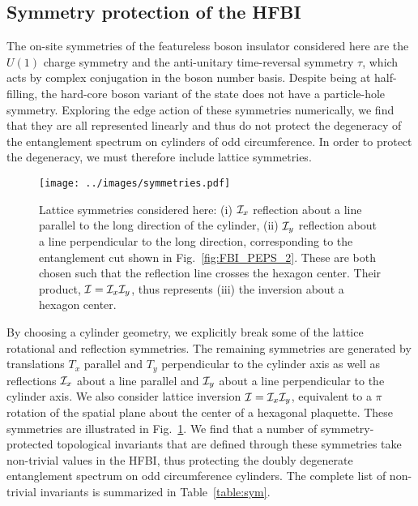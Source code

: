 \subsection{Symmetry protection of the HFBI}

The on-site symmetries of the featureless boson insulator considered here
are the $U(1)$ charge symmetry and the 
anti-unitary time-reversal symmetry $\tau$, which acts by complex conjugation in the boson number basis.
Despite being at half-filling, the hard-core boson variant of the state does not have a particle-hole
symmetry. Exploring the edge action of these symmetries numerically, we find that they are all
represented linearly and thus do not protect the degeneracy of the entanglement spectrum
on cylinders of odd circumference.
In order to protect the degeneracy, we must therefore include lattice symmetries.

\begin{figure}
  \texttt{[image: ../images/symmetries.pdf]}
  \caption{Lattice symmetries considered here:
  (i) $\mathcal{I}_x$ reflection about a line parallel to the long direction of the cylinder,
  (ii) $\mathcal{I}_y$ reflection about a line perpendicular to the long direction, corresponding to the entanglement
  cut shown in Fig.~\ref{fig:FBI_PEPS_2}. These are both chosen such that the reflection line
  crosses the hexagon center. Their product, $\mathcal{I} = \mathcal{I}_x \mathcal{I}_y$, thus represents (iii) the inversion about
  a hexagon center. \label{fig:symm} }
\end{figure}

By choosing a cylinder geometry, we explicitly break some of the lattice rotational
and reflection symmetries. The remaining symmetries are generated by
translations $T_x$ parallel and $T_y$ perpendicular to the cylinder axis
as well as reflections $\mathcal{I}_x$ about a line parallel and $\mathcal{I}_y$ about a line perpendicular to 
the cylinder axis. We also consider lattice inversion $\mathcal{I} = \mathcal{I}_x \mathcal{I}_y$, equivalent to a $\pi$ 
rotation of the spatial plane about the center of a hexagonal plaquette. These symmetries are
illustrated in Fig.~\ref{fig:symm}.
We find that a number of symmetry-protected topological invariants that are defined through these symmetries
take non-trivial values in the HFBI, thus protecting the doubly degenerate entanglement spectrum
on odd circumference cylinders. The complete list of non-trivial invariants is summarized in
Table~\ref{table:sym}. 

